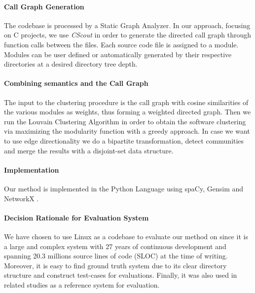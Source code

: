 \documentclass[sigconf,review, anonymous]{acmart}
\begin{document}
\paragraph{Call Graph Generation} 
The codebase is processed by a Static Graph Analyzer. 
In our approach, focusing on C projects, we use \emph{CScout} \cite{cscout} in order to generate the directed call graph through function calls between the files. 
Each source code file is assigned to a module. 
Modules can be user defined or automatically generated by their respective directories at a desired directory tree depth. 

\paragraph{Combining semantics and the Call Graph} 
The input to the clustering procedure
is the call graph with cosine similarities of the various modules as weights, thus forming a
weighted directed graph. Then we run the Louvain Clustering Algorithm \cite{louvain} in
order to obtain the software clustering via maximizing the modularity function with a greedy approach. 
In case we want to use edge directionality we do a bipartite transformation, detect communities and
merge the results with a disjoint-set data structure.
    

\paragraph{Implementation}  
Our method is implemented in the Python Language using spaCy\cite{spacy}, Gensim \cite{gensim} and NetworkX \cite{nx}.

\paragraph{Decision Rationale for Evaluation System} 
We have chosen to use Linux as a codebase to evaluate our method on 
since it is a large and complex system with 27 years of continuous development and spanning 20.3 millions source lines of code (SLOC) at the time of writing.  
Moreover, it is easy to find ground truth system due to its clear directory structure and construct test-cases for
evaluations. 
Finally, it was also used in related studies \cite{acdc, evaluation} as a reference system for evaluation. 
\end{document}
